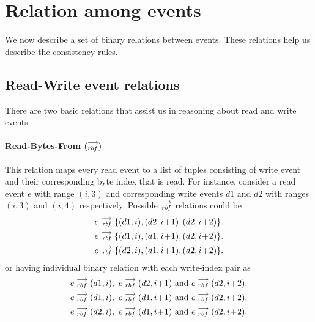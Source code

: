     \section{Relation among events}
        We now describe a set of binary relations between events. These relations help us describe the consistency rules.
        
        \subsection{Read-Write event relations}
            There are two basic relations that assist us in reasoning about read and write events.

            \paragraph{Read-Bytes-From $(\stackrel{\longrightarrow}{_{rbf}})$}
            This relation maps every read event to a list of tuples consisting of write event and their corresponding byte index that is read. 
            For instance, consider a read event $e$ with range $(i, 3)$ and corresponding write events $d1$ and $d2$ with ranges $(i, 3)$ and $(i,4)$ respectively. 
            Possible $\stackrel{\longrightarrow}{_\textit{rbf}}$ relations could be  
                \begin{align*}
                    \reln{e}{\textit{rbf}}{\{(d1, i), (d2, i\!+\!1), (d2, i\!+\!2)\}}. \\
                    \reln{e}{\textit{rbf}}{\{(d1, i), (d1, i\!+\!1), (d2, i\!+\!2)\}}. \\
                    \reln{e}{\textit{rbf}}{\{(d2, i), (d1, i\!+\!1), (d2, i\!+\!2)\}}.       
                \end{align*}   
            or having individual binary relation with each write-index pair as 
            \begin{align*}
                \reln{e}{rbf}{(d1, i)},\ \reln{e}{rbf}{(d2, i\!+\!1)}  \text{ and } \reln{e}{rbf}{(d2, i\!+\!2)}. \\
                \reln{e}{rbf}{(d1, i)},\ \reln{e}{rbf}{(d1, i\!+\!1)}  \text{ and } \reln{e}{rbf}{(d2, i\!+\!2)}. \\
                \reln{e}{rbf}{(d2, i)},\ \reln{e}{rbf}{(d1, i\!+\!1)}  \text{ and } \reln{e}{rbf}{(d2, i\!+\!2)}. 
            \end{align*}
            
